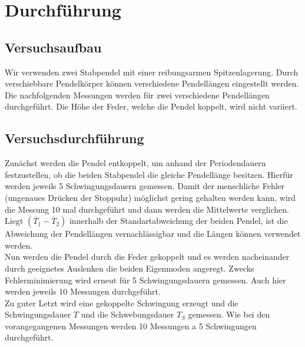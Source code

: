 \section{Durchführung}
\label{sec:Durchführung}

\subsection{Versuchsaufbau}
    Wir verwenden zwei Stabpendel mit einer reibungsarmen Spitzenlagerung. Durch verschiebbare
    Pendelkörper können verschiedene Pendellängen eingestellt werden. Die nachfolgenden 
    Messungen werden für zwei verschiedene Pendellängen durchgeführt. Die Höhe der Feder, 
    welche die Pendel koppelt, wird nicht variiert.
\subsection{Versuchsdurchführung}
    Zunächst werden die Pendel entkoppelt, um anhand der Periodendauern festzustellen,
    ob die beiden Stabpendel die gleiche Pendellänge besitzen. Hierfür werden jeweils 5 
    Schwingungsdauern gemessen. Damit der menschliche Fehler (ungenaues Drücken der Stoppuhr) 
    möglichst gering gehalten werden kann, wird die Messung 10 mal durchgeführt und dann 
    werden die Mittelwerte verglichen. Liegt $(\overline T_1-\overline T_2)$ innerhalb der 
    Standartabweichung der beiden Pendel, ist die Abweichung der Pendellängen vernachlässigbar 
    und die Längen können verwendet werden. \\
    Nun werden die Pendel durch die Feder gekoppelt und es werden nacheinander durch 
    geeignetes Auslenken die beiden Eigenmoden angeregt. Zwecks Fehlerminimierung wird 
    erneut für 5 Schwingungsdauern gemessen. Auch hier werden jeweils 10 Messungen durchgeführt.\\
    Zu guter Letzt wird eine gekoppelte Schwingung erzeugt und die Schwingungsdauer $T$ und 
    die Schwebungsdauer $T_S$ gemessen. Wie bei den vorangegangenen Messungen werden 10 Messungen a 5 
    Schwingungen durchgeführt.